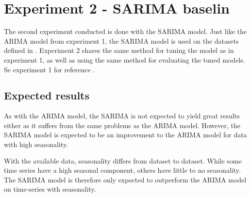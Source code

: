   \section{Experiment 2 - SARIMA baselin}
  \label{section:Method:Experiment2}

  The second experiment conducted is done with the SARIMA model.
  Just like the ARIMA model from experiment 1, the SARIMA model is used on the datasets defined in .
  Experiment 2 shares the same method for tuning the model as in experiment 1,
  as well as using the same method for evaluating the tuned models.
  Se experiment 1 for reference .

  \subsection{Expected results}
  As with the ARIMA model, the SARIMA is not expected to yield great results either as it suffers from the same problems as the ARIMA model.
  However, the SARIMA model is expected to be an improvement to the ARIMA model for data with high seasonality.

  With the available data, seasonality differs from dataset to dataset. While some time series have a high seasonal component,
  others have little to no seasonality.
  The SARIMA model is therefore only expected to outperform the ARIMA model on time-series with seasonality.

\fi